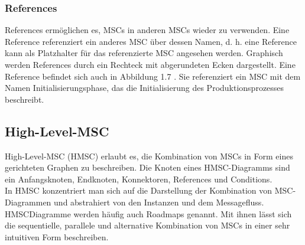 \subsubsection{References}
References ermöglichen es, MSCs in anderen MSCs wieder
zu verwenden. Eine Reference referenziert ein anderes
MSC über dessen Namen, d. h. eine Reference kann als
Platzhalter für das referenzierte MSC angesehen werden.
Graphisch werden References durch ein Rechteck mit abgerundeten
Ecken dargestellt. Eine Reference befindet sich
auch in Abbildung 1.7 . Sie referenziert ein MSC mit dem Namen
Initialisierungsphase, das die Initialisierung
des Produktionsprozesses beschreibt.\\
\subsection{High-Level-MSC}
High-Level-MSC (HMSC) erlaubt es, die Kombination von
MSCs in Form eines gerichteten Graphen zu beschreiben.
Die Knoten eines HMSC-Diagramms sind ein Anfangsknoten, Endknoten, Konnektoren, References und Conditions.
\\ In HMSC konzentriert man sich auf die Darstellung
der Kombination von MSC-Diagrammen und abstrahiert
von den Instanzen und dem Messagefluss. HMSCDiagramme
werden häufig auch Roadmaps genannt. Mit
ihnen lässt sich die sequentielle, parallele und alternative
Kombination von MSCs in einer sehr intuitiven Form beschreiben.\\

